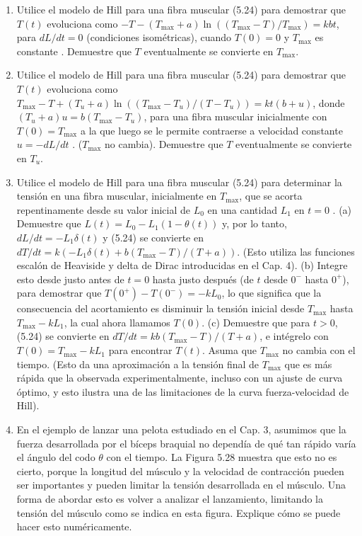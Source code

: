 \documentclass[12pt]{book}
\begin{document}
\begin{enumerate}
\item[5.22] Utilice el modelo de Hill para una fibra muscular (5.24) para demostrar que $T(t)$ evoluciona como $-T - (T_{\text{max}} + a) \ln((T_{\text{max}} - T)/T_{\text{max}}) = kbt$, para $dL/dt = 0$ (condiciones isométricas), cuando $T(0) = 0$ y $T_{\text{max}}$ es constante \cite{41}. Demuestre que $T$ eventualmente se convierte en $T_{\text{max}}$.

\item[5.23] Utilice el modelo de Hill para una fibra muscular (5.24) para demostrar que $T(t)$ evoluciona como $T_{\text{max}} - T + (T_u + a) \ln((T_{\text{max}} - T_u)/(T - T_u)) = kt(b + u)$, donde $(T_u + a)u = b(T_{\text{max}} - T_u)$, para una fibra muscular inicialmente con $T(0) = T_{\text{max}}$ a la que luego se le permite contraerse a velocidad constante $u = -dL/dt$ \cite{41}. ($T_{\text{max}}$ no cambia). Demuestre que $T$ eventualmente se convierte en $T_u$.

\item[5.24] Utilice el modelo de Hill para una fibra muscular (5.24) para determinar la tensión en una fibra muscular, inicialmente en $T_{\text{max}}$, que se acorta repentinamente desde su valor inicial de $L_0$ en una cantidad $L_1$ en $t = 0$ \cite{41}.
(a) Demuestre que $L(t) = L_0 - L_1(1 - \theta(t))$ y, por lo tanto, $dL/dt = -L_1 \delta(t)$ y (5.24) se convierte en $dT/dt = k(-L_1 \delta(t) + b(T_{\text{max}} - T)/(T + a))$. (Esto utiliza las funciones escalón de Heaviside y delta de Dirac introducidas en el Cap. 4).
(b) Integre esto desde justo antes de $t = 0$ hasta justo después (de $t$ desde $0^-$ hasta $0^+$), para demostrar que $T(0^+) - T(0^-) = -kL_0$, lo que significa que la consecuencia del acortamiento es disminuir la tensión inicial desde $T_{\text{max}}$ hasta $T_{\text{max}} - kL_1$, la cual ahora llamamos $T(0)$.
(c) Demuestre que para $t > 0$, (5.24) se convierte en $dT/dt = kb(T_{\text{max}} - T)/(T + a)$, e intégrelo con $T(0) = T_{\text{max}} - kL_1$ para encontrar $T(t)$. Asuma que $T_{\text{max}}$ no cambia con el tiempo. (Esto da una aproximación a la tensión final de $T_{\text{max}}$ que es más rápida que la observada experimentalmente, incluso con un ajuste de curva óptimo, y esto ilustra una de las limitaciones de la curva fuerza-velocidad de Hill).

\item[5.25] En el ejemplo de lanzar una pelota estudiado en el Cap. 3, asumimos que la fuerza desarrollada por el bíceps braquial no dependía de qué tan rápido varía el ángulo del codo $\theta$ con el tiempo. La Figura 5.28 muestra que esto no es cierto, porque la longitud del músculo y la velocidad de contracción pueden ser importantes y pueden limitar la tensión desarrollada en el músculo. Una forma de abordar esto es volver a analizar el lanzamiento, limitando la tensión del músculo como se indica en esta figura. Explique cómo se puede hacer esto numéricamente.


\end{enumerate}
\end{document}
